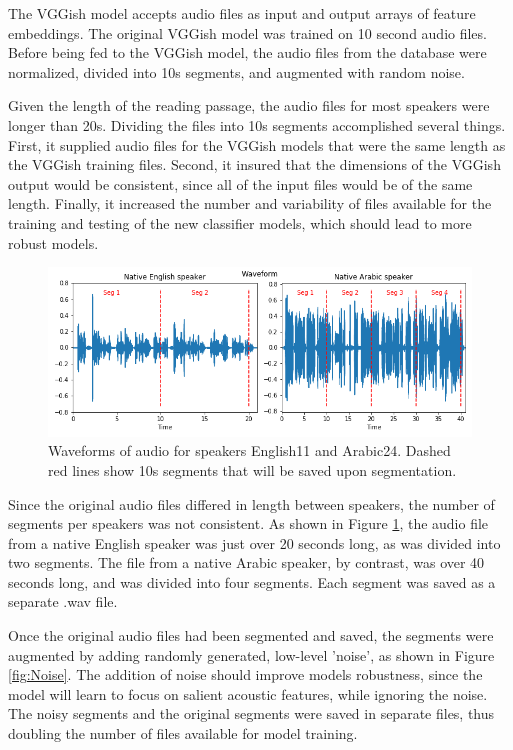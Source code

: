 The VGGish model accepts audio files as input and output arrays of feature embeddings. The original VGGish model was trained on 10 second audio files. Before being fed to the VGGish model, the audio files from the database were normalized, divided into 10s segments, and augmented with random noise.

Given the length of the reading passage, the audio files for most speakers were longer than 20s. Dividing the files into 10s segments accomplished several things. First, it supplied audio files for the VGGish models that were the same length as the VGGish training files. Second, it insured that the dimensions of the VGGish output would be consistent, since all of the input files would be of the same length. Finally, it increased the number and variability of files available for the training and testing of the new classifier models, which should lead to more robust models.

\begin{figure}[h]
\begin{center}
\includegraphics[width=5in]{Waveforms.png}
\caption{Waveforms of audio for speakers English11 and Arabic24. Dashed red lines show 10s segments that will be saved upon segmentation. }
\label{fig:Waveform}
\end{center}
\end{figure}

Since the original audio files differed in length between speakers, the number of segments per speakers was not consistent. As shown in Figure \ref{fig:Waveform}, the audio file from a native English speaker was just over 20 seconds long, as was divided into two segments. The file from a native Arabic speaker, by contrast, was over 40 seconds long, and was divided into four segments. Each segment was saved as a separate .wav file.

Once the original audio files had been segmented and saved, the segments were augmented by adding randomly generated, low-level 'noise', as shown in Figure \ref{fig:Noise}. The addition of noise should improve models robustness, since the model will learn to focus on salient acoustic features, while ignoring the noise. The noisy segments and the original segments were saved in separate files, thus doubling the number of files available for model training.

